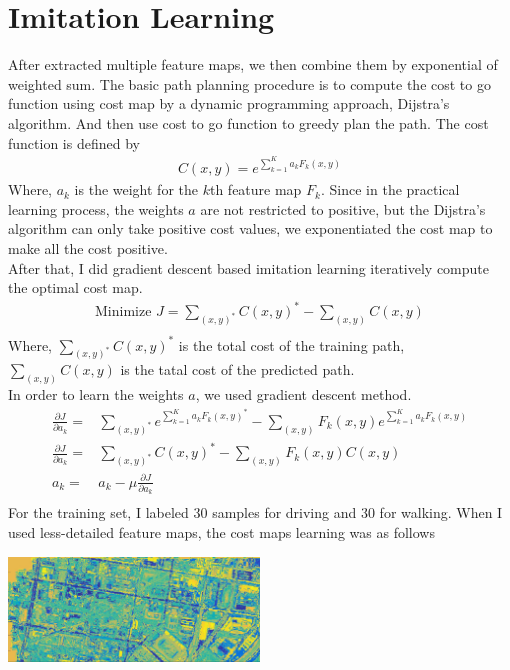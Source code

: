 \documentclass[letterpaper,twocolumn,10pt]{article}
\begin{document}
\section{Imitation Learning}
After extracted multiple feature maps, we then combine them by exponential of weighted sum. The basic path planning procedure is to compute the cost to go function using cost map by a dynamic programming approach, Dijstra's algorithm. And then use cost to go function to greedy plan the path. The cost function is defined by\\
\begin{align*}
C(x,y) = e^{\sum_{k=1}^K a_k F_k(x,y)} 
\end{align*}
Where, $a_k$ is the weight for the $k$th feature map $F_k$. Since in the practical learning process, the weights $a$ are not restricted to positive, but the Dijstra's algorithm can only take positive cost values, we exponentiated the cost map to make all the cost positive.\\
After that, I did gradient descent based imitation learning iteratively compute the optimal cost map.\\
\begin{align*}
\mbox{Minimize } J = \sum_{(x,y)^*} C(x,y)^* - \sum_{(x,y)} C(x,y)\\
\end{align*}
Where, $\sum_{(x,y)^*} C(x,y)^*$ is the total cost of the training path, $\sum_{(x,y)} C(x,y)$ is the tatal cost of the predicted path.\\
In order to learn the weights $a$, we used gradient descent method. \\
\begin{align*}
\frac{\partial J}{\partial a_k} =& \sum_{(x,y)^*} e^{\sum_{k=1}^K a_k F_k(x,y)^*} - \sum_{(x,y)}F_k(x,y)e^{\sum_{k=1}^K a_k F_k(x,y)}\\
\frac{\partial J}{\partial a_k} =& \sum_{(x,y)^*} C(x,y)^* - \sum_{(x,y)}F_k(x,y)C(x,y)\\
a_k = & a_k - \mu \frac{\partial J}{\partial a_k}\\
\end{align*}
For the training set, I labeled 30 samples for driving and 30 for walking. When I used less-detailed feature maps, the cost maps learning was as follows\\
\begin{center}
    \includegraphics[width=0.5\textwidth]{results/featmap_apr3.jpg}
\end{center}
\end{document}
